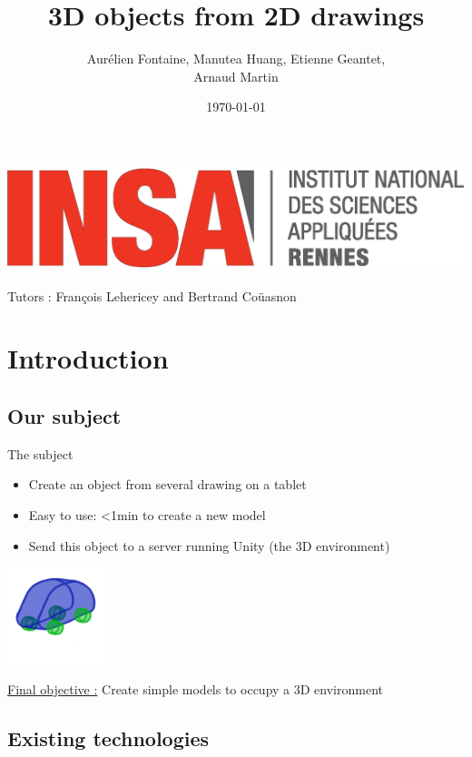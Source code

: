 \documentclass[a4paper,10pt]{beamer}
\title{3D objects from 2D drawings}
\author[Groupe 3INFO]{Aurélien Fontaine, Manutea Huang, Etienne Geantet, \\ Arnaud Martin}
\institute[INSA de Rennes]{Institut National des Sciences Appliquées de Rennes}
\date{\today}
\begin{document}
	
	\begin{frame}
		\begin{titlepage}
			\centerline{\includegraphics[scale=0.1]{images/logos/logoINSA.jpg}}
			\centerline{Tutors : François Lehericey and Bertrand Coüasnon}	
		\end{titlepage}
	\end{frame}

	\section{Introduction}

		
		\subsection{Our subject}
		
		\begin{frame}{The subject}
			\begin{itemize}
				\item Create an object from several drawing on a tablet
				\item Easy to use: <1min to create a new model
				\item Send this object to a server running Unity (the 3D environment)
			\end{itemize}
			\centerline{\includegraphics[height=80pt]{images/modelcar.png}}              
			\underline{Final objective :} Create simple models to occupy a 3D environment
		\end{frame}
		
			
	\begin{frame}
		\tableofcontents
	\end{frame}
			
		\subsection{Existing technologies}
		
\end{document}
